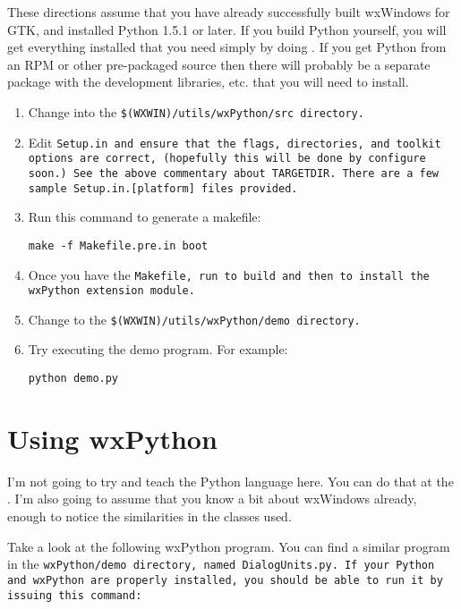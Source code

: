 
These directions assume that you have already successfully built
wxWindows for GTK, and installed Python 1.5.1 or later.  If you build Python
yourself, you will get everything installed that you need simply by
doing .  If you get Python from an RPM or other
pre-packaged source then there will probably be a separate package
with the development libraries, etc. that you will need to install.


\begin{enumerate}\itemsep=0pt
\item Change into the \tt{\$(WXWIN)/utils/wxPython/src} directory.
\item Edit \tt{Setup.in} and ensure that the flags, directories, and toolkit
options are correct, (hopefully this will be done by \tt{configure}
soon.)  See the above commentary about \tt{TARGETDIR}.  There are a
few sample Setup.in.[platform] files provided.
\item Run this command to generate a makefile:

\tt{make -f Makefile.pre.in boot}

\item Once you have the \tt{Makefile}, run  to build and then
 to install the wxPython extension module.
\item Change to the \tt{\$(WXWIN)/utils/wxPython/demo} directory.
\item Try executing the demo program.  For example:

\tt{python demo.py}
\end{enumerate}


\section{Using wxPython}\label{wxpusing}


I'm not going to try and teach the Python language here.  You can do
that at the .
I'm also going to assume that you know a bit about wxWindows already,
enough to notice the similarities in the classes used.

Take a look at the following wxPython program.  You can find a similar
program in the \tt{wxPython/demo} directory, named \tt{DialogUnits.py}.  If your
Python and wxPython are properly installed, you should be able to run
it by issuing this command:

